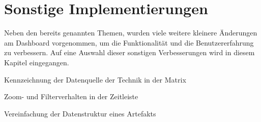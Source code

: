 \section{Sonstige Implementierungen}
Neben den bereits genannten Themen, wurden viele weitere kleinere Änderungen am Dashboard vorgenommen, um die Funktionalität und die Benutzererfahrung zu verbessern. Auf eine Auswahl dieser sonstigen Verbesserungen wird in diesem Kapitel eingegangen.

\par Kennzeichnung der Datenquelle der Technik in der Matrix

\par Zoom- und Filterverhalten in der Zeitleiste

\par Vereinfachung der Datenstruktur eines Artefakts

